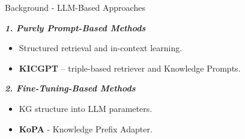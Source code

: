 \documentclass[aspectratio=169,xcolor=dvipsnames]{beamer}
\begin{document}
\begin{frame}{Background - LLM-Based Approaches}

    \vspace{0.2cm}
    \textbf{\textit{1. Purely Prompt-Based Methods}}
    \begin{itemize}
        \item Structured retrieval and in-context learning.
        \item \textbf{KICGPT} – triple-based retriever and Knowledge Prompts.
    \end{itemize}

    \textbf{\textit{2. Fine-Tuning-Based Methods}}
    \begin{itemize}
        \item KG structure into LLM parameters.
        \item \textbf{KoPA} - Knowledge Prefix Adapter.
    \end{itemize}

    \vspace{0.3cm}
        \begin{center}
    \end{center}

\end{frame}
\end{document}
